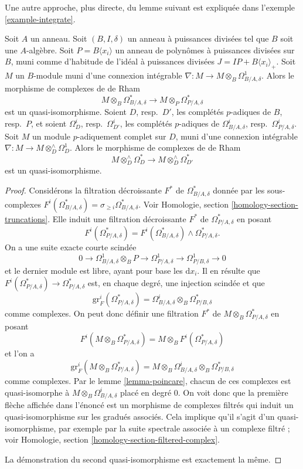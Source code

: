\noindent
Une autre approche, plus directe, du lemme suivant est
expliquée dans l'exemple \ref{example-integrate}.

\begin{lemma}
\label{lemma-relative-poincare}
Soit $A$ un anneau. Soit $(B, I, \delta)$ un anneau à puissances divisées
tel que $B$ soit une $A$-algèbre.
Soit $P = B\langle x_i \rangle$ un anneau de polynômes à puissances divisées
sur $B$, muni comme d'habitude de l'idéal à puissances divisées $J = IP + B\langle x_i \rangle_{+}$.
Soit $M$ un $B$-module muni d'une connexion intégrable
$\nabla : M \to M \otimes_B \Omega^1_{B/A, \delta}$. Alors le morphisme de
complexes de de Rham
$$
M \otimes_B \Omega^*_{B/A, \delta}
\longrightarrow
M \otimes_P \Omega^*_{P/A, \delta}
$$
est un quasi-isomorphisme. Soient $D$, resp.\ $D'$, les complétés $p$-adiques de
$B$, resp.\ $P$, et soient $\Omega^i_D$, resp.\ $\Omega^i_{D'}$, les complétés $p$-adiques
de $\Omega^i_{B/A, \delta}$,
resp.\ $\Omega^i_{P/A, \delta}$. Soit $M$ un module $p$-adiquement complet
sur $D$, muni d'une connexion intégrable
$\nabla : M \to M \otimes^\wedge_D \Omega^1_D$.
Alors le morphisme de complexes de de Rham
$$
M \otimes^\wedge_D \Omega^*_D
\longrightarrow
M \otimes^\wedge_D \Omega^*_{D'}
$$
est un quasi-isomorphisme.
\end{lemma}

\begin{proof}
Considérons la filtration décroissante $F^*$ de $\Omega^*_{B/A, \delta}$
donnée par les sous-complexes
$F^i(\Omega^*_{B/A, \delta}) = \sigma_{\geq i}\Omega^*_{B/A, \delta}$.
Voir Homologie, section \ref{homology-section-truncations}.
Elle induit une filtration décroissante $F^*$ de $\Omega^*_{P/A, \delta}$
en posant
$$
F^i(\Omega^*_{P/A, \delta}) =
F^i(\Omega^*_{B/A, \delta}) \wedge \Omega^*_{P/A, \delta}.
$$
On a une suite exacte courte scindée
$$
0 \to \Omega^1_{B/A, \delta} \otimes_B P \to
\Omega^1_{P/A, \delta} \to
\Omega^1_{P/B, \delta} \to 0
$$
et le dernier module est libre, ayant pour base les $\text{d}x_i$. Il en résulte que
$F^i(\Omega^*_{P/A, \delta}) \to \Omega^*_{P/A, \delta}$ est, en chaque degré, une
injection scindée et que
$$
\text{gr}^i_F(\Omega^*_{P/A, \delta}) =
\Omega^i_{B/A, \delta} \otimes_B \Omega^*_{P/B, \delta}
$$
comme complexes. On peut donc définir une filtration $F^*$ de
$M \otimes_B \Omega^*_{P/A, \delta}$ en posant
$$
F^i(M \otimes_B \Omega^*_{P/A, \delta}) =
M \otimes_B F^i(\Omega^*_{P/A, \delta})
$$
et l'on a
$$
\text{gr}^i_F(M \otimes_B \Omega^*_{P/A, \delta}) =
M \otimes_B \Omega^i_{B/A, \delta} \otimes_B \Omega^*_{P/B, \delta}
$$
comme complexes.
Par le lemme \ref{lemma-poincare}, chacun de ces complexes est
quasi-isomorphe à $M \otimes_B \Omega^i_{B/A, \delta}$ placé en degré $0$.
On voit donc que la première flèche affichée dans l'énoncé est un morphisme de
complexes filtrés qui induit un quasi-isomorphisme sur les gradués associés. Cela
implique qu'il s'agit d'un quasi-isomorphisme, par exemple par la suite spectrale
associée à un complexe filtré ; voir
Homologie, section \ref{homology-section-filtered-complex}.

\medskip\noindent
La démonstration du second quasi-isomorphisme est exactement la même.
\end{proof}



